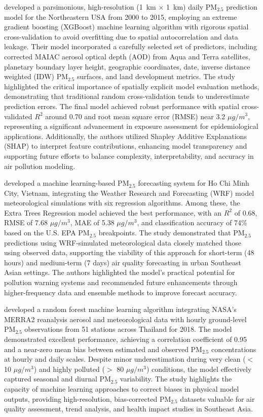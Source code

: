 \documentclass[11pt]{article}
\begin{document}
\citet{stirnberg2020mapping} developed a parsimonious, high-resolution (1~km $\times$ 1~km) daily PM$_{2.5}$ prediction model for the Northeastern USA from 2000 to 2015, employing an extreme gradient boosting (XGBoost) machine learning algorithm with rigorous spatial cross-validation to avoid overfitting due to spatial autocorrelation and data leakage. Their model incorporated a carefully selected set of predictors, including corrected MAIAC aerosol optical depth (AOD) from Aqua and Terra satellites, planetary boundary layer height, geographic coordinates, date, inverse distance weighted (IDW) PM$_{2.5}$ surfaces, and land development metrics. The study highlighted the critical importance of spatially explicit model evaluation methods, demonstrating that traditional random cross-validation tends to underestimate prediction errors. The final model achieved robust performance with spatial cross-validated \( R^{2} \) around 0.70 and root mean square error (RMSE) near 3.2 \(\mu g/m^{3}\), representing a significant advancement in exposure assessment for epidemiological applications. Additionally, the authors utilized Shapley Additive Explanations (SHAP) to interpret feature contributions, enhancing model transparency and supporting future efforts to balance complexity, interpretability, and accuracy in air pollution modeling.

\citet{minh2021pm2} developed a machine learning-based PM$_{2.5}$ forecasting system for Ho Chi Minh City, Vietnam, integrating the Weather Research and Forecasting (WRF) model meteorological simulations with six regression algorithms. Among these, the Extra Trees Regression model achieved the best performance, with an \( R^{2} \) of 0.68, RMSE of 7.68 \(\mu g/m^{3}\), MAE of 5.38 \(\mu g/m^{3}\), and classification accuracy of 74\% based on the U.S. EPA PM$_{2.5}$ breakpoints. The study demonstrated that PM$_{2.5}$ predictions using WRF-simulated meteorological data closely matched those using observed data, supporting the viability of this approach for short-term (48 hours) and medium-term (7 days) air quality forecasting in urban Southeast Asian settings. The authors highlighted the model’s practical potential for pollution warning systems and recommended future enhancements through higher-frequency data and ensemble methods to improve forecast accuracy.

\citet{gupta2021machine} developed a random forest machine learning algorithm integrating NASA's MERRA2 reanalysis aerosol and meteorological data with hourly ground-level PM$_{2.5}$ observations from 51 stations across Thailand for 2018. The model demonstrated excellent performance, achieving a correlation coefficient of 0.95 and a near-zero mean bias between estimated and observed PM$_{2.5}$ concentrations at hourly and daily scales. Despite minor underestimation during very clean ($<$ 10 \(\mu g/m^{3}\)) and highly polluted ($>$ 80 \(\mu g/m^{3}\)) conditions, the model effectively captured seasonal and diurnal PM$_{2.5}$ variability. The study highlights the capacity of machine learning approaches to correct biases in physical model outputs, providing high-resolution, bias-corrected PM$_{2.5}$ datasets valuable for air quality assessment, trend analysis, and health impact studies in Southeast Asia.
\end{document}
